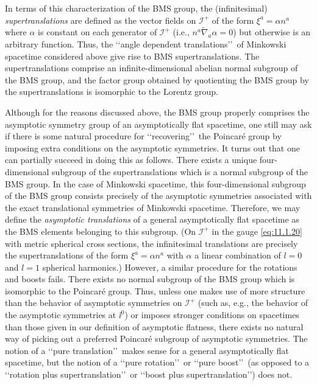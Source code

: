 In terms of this characterization of the BMS group, the (infinitesimal)
\emph{supertranslations} are defined as the vector fields on \(\mathcal I^+\) of the
form \(\xi^a=\alpha n^a\) where \(\alpha\) is constant on each generator of
\(\mathcal I^+\) (i.e., \(n^a\tilde\nabla_a\alpha=0\)) but otherwise is an arbitrary
function. Thus, the \lq\lq angle dependent translations\rq\rq\ of Minkowski spacetime
considered above give rise to BMS supertranslations. The supertranslations comprise
an infinite-dimensional abelian normal subgroup of the BMS group, and the factor
group obtained by quotienting the BMS group by the supertranslations is isomorphic
to the Lorentz group.

Although for the reasons discussed above, the BMS group properly comprises the
asymptotic symmetry group of an asymptotically flat spacetime, one still may ask if
there is some natural procedure for \lq\lq recovering\rq\rq\ the Poincar\'e group by
imposing extra conditions on the asymptotic symmetries. It turns out that one can
partially succeed in doing this as follows. There exists a unique four-dimensional
subgroup of the supertranslations which is a normal subgroup of the BMS group. In
the case of Minkowski spacetime, this four-dimensional subgroup of the BMS group
consists precisely of the asymptotic symmetries associated with the exact
translational symmetries of Minkowski spacetime. Therefore, we may define the
\emph{asymptotic translations} of a general asymptotically flat spacetime as the BMS
elements belonging to this subgroup. (On \(\mathcal I^+\) in the gauge
\eqref{eq:11.1.20} with metric spherical cross sections, the infinitesimal translations
are precisely the supertranslations of the form \(\xi^a=\alpha n^a\) with \(\alpha\) a
linear combination of \(l=0\) and \(l=1\) spherical harmonics.) However, a similar
procedure for the rotations and boosts fails. There exists no normal subgroup of the
BMS group which is isomorphic to the Poincar\'e group. Thus, unless one makes use
of more structure than the behavior of asymptotic symmetries on \(\mathcal I^+\)
(such as, e.g., the behavior of the asymptotic symmetries at \(\ii^0\)) or imposes
stronger conditions on spacetimes than those given in our definition of asymptotic
flatness, there exists no natural way of picking out a preferred Poincar\'e subgroup of
asymptotic symmetries. The notion of a \lq\lq pure translation\rq\rq\ makes sense for a
general asymptotically flat spacetime, but the notion of a \lq\lq pure rotation\rq\rq\ or
\lq\lq pure boost\rq\rq\ (as opposed to a \lq\lq rotation plus supertranslation\rq\rq\ or
\lq\lq boost plus supertranslation\rq\rq) does not.

